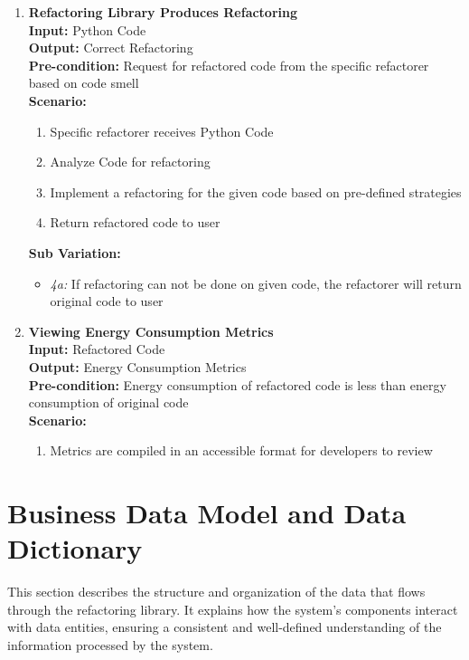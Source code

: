 \documentclass[12pt]{article}
\begin{document}
\begin{enumerate}[label={\bf BUC \arabic*:}, wide=0pt, font=\itshape]
  \item {\bf Refactoring Library Produces Refactoring} \\[2mm]
    \textbf{Input:} Python Code \\
    \textbf{Output:} Correct Refactoring \\
    \textbf{Pre-condition:} Request for refactored code from the
    specific refactorer
    based on code smell\\[2mm]
    \textbf{Scenario: }
    \begin{enumerate}[label=\arabic*.]
      \item Specific refactorer receives Python Code
      \item Analyze Code for refactoring
      \item Implement a refactoring for the given code based on
        pre-defined strategies
      \item Return refactored code to user
    \end{enumerate}
    \textbf{Sub Variation: }
    \begin{itemize}
      \item \textit{4a:} If refactoring can not be done on given
        code, the refactorer
        will return original code to user
    \end{itemize}

  \item {\bf Viewing Energy Consumption Metrics} \\[2mm]
    \textbf{Input:} Refactored Code \\
    \textbf{Output:} Energy Consumption Metrics \\
    \textbf{Pre-condition:} Energy consumption of refactored code is
    less than energy consumption
    of original code \\[2mm]
    \textbf{Scenario: }
    \begin{enumerate}[label=\arabic*.]
      \item Metrics are compiled in an accessible format for
        developers to review
    \end{enumerate}
\end{enumerate}

\newpage
\section{Business Data Model and Data Dictionary}

This section describes the structure and organization of the data
that flows through the refactoring library. It explains how the
system's components interact with data entities, ensuring a
consistent and well-defined understanding of the information
processed by the system.
\end{document}

